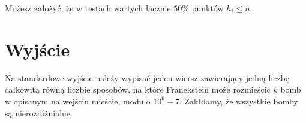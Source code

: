 \documentclass[zad,zawodnik,utf8]{sinol}
\begin{document}
\begin{tasktext}
Możesz założyć, że w testach wartych łącznie $50\%$ punktów $h_i \leq n$.

  \section{Wyjście}
    Na standardowe wyjście należy wypisać jeden wiersz zawierający jedną liczbę całkowitą równą liczbie sposobów, na które Franekstein może rozmieścić $k$ bomb
    w opisanym na wejściu mieście, modulo $10^9 + 7$. Zakłdamy, że wszystkie bomby są nierozróżnialne.
    
    \makecompactexample

  \end{tasktext}
\end{document}
